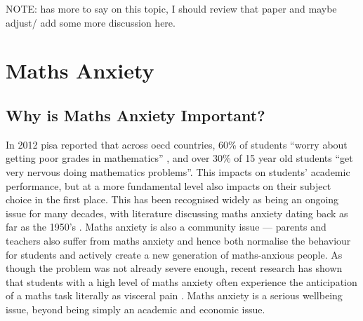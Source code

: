 \documentclass[twoside,12pt,a4paper]{report}
\begin{document}
NOTE: \cite{King2015} has more to say on this topic, I should review that paper and maybe adjust/ add some more discussion here.






\section{Maths Anxiety}


\subsection*{Why is Maths Anxiety Important?}

In 2012 \gls{pisa} reported that across \gls{oecd} countries, 60\% of students ``worry about getting poor grades in mathematics''  \cite{PISA2013}, and over 30\% of 15 year old students ``get very nervous doing mathematics problems''. This impacts on students' academic performance, but at a more fundamental level also impacts on their subject choice in the first place. This has been recognised widely as being an ongoing issue for many decades, with literature discussing maths anxiety dating back as far as the 1950's \cite{Dreger1957}. Maths anxiety is also a community issue --- parents and teachers also suffer from maths anxiety and hence both normalise the behaviour for students and actively create a new generation of maths-anxious people. As though the problem was not already severe enough, recent research has shown that students with a high level of maths anxiety often experience the anticipation of a maths task literally as visceral pain \cite{Lyons2012pain}. Maths anxiety is a serious wellbeing issue, beyond being simply an academic and economic issue.
\end{document}
